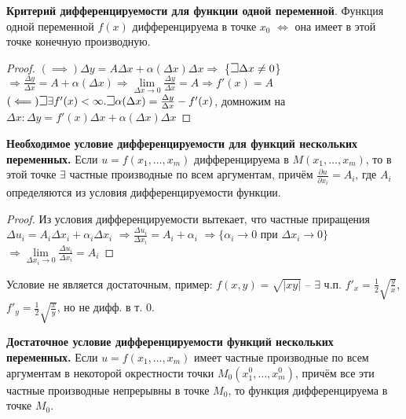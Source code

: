 \textbf{Критерий дифференцируемости для функции одной переменной}. Функция одной переменной $f(x)$ дифференцируема в точке $x_0$ $\iff$ она имеет в этой точке конечную производную.

\begin{proof} 
$(\implies) \Delta y = A \Delta x + \alpha(\Delta x)\Delta x \Rightarrow$ \{$\mathLet \Delta x \neq 0$\} $\Rightarrow \frac{\Delta y}{\Delta x}=A + \alpha(\Delta x) \Rightarrow \lim\limits_{\Delta x \to 0}\frac{\Delta y}{\Delta x}=A \Rightarrow f'(x) = A$\\
$(\impliedby) \mathLet \exists f'(x) < \infty. \mathLet \alpha(\Delta x)=\frac{\Delta y}{\Delta x}-f'(x)$, домножим на $\Delta x: \Delta y=f'(x)\Delta x+\alpha(\Delta x)\Delta x$
\end{proof}
\bigbreak

\textbf{Необходимое условие дифференцируемости для функций нескольких переменных.} Если $u = f(x_1,\dots,x_m)$ дифференцируема в $M(x_1,\dots,x_m)$, то в этой точке $\exists$ частные производные по всем аргументам, причём $\frac{\partial u}{\partial x_i} = A_i$, где $A_i$ определяются из условия дифференцируемости функции.

\begin{proof}
Из условия дифференцируемости вытекает, что частные приращения 
$\Delta u_i = A_i\Delta x_i+\alpha_i\Delta x_i$
$\Rightarrow \frac{\Delta u_i}{\Delta x_i} = A_i + \alpha_i $
$\Rightarrow \{\alpha_i \to 0$ при $\Delta x_i \to 0\} $
$\Rightarrow \lim\limits_{\Delta x_i \to 0}\frac{\Delta u_i}{\Delta x_i}=A_i$
\end{proof}

Условие не является достаточным, пример: $f(x, y) = \sqrt{\left|xy\right|}$ -- $\exists$ ч.п. 
$f'_x = \frac{1}{2} \sqrt{\frac{y}{x}}$, $f'_y = \frac{1}{2} \sqrt{\frac{x}{y}}$, но не дифф. в т. 0.
\bigbreak

\textbf{Достаточное условие дифференцируемости функций нескольких переменных.} Если $u = f(x_1,\dots,x_m)$ имеет частные производные по всем аргументам в некоторой окрестности точки $M_0(x^0_1, \dots, x^0_m)$, причём все эти частные производные непрерывны в точке $M_0$, то функция дифференцируема в точке $M_0$.

